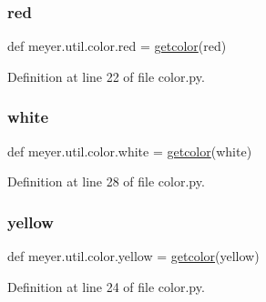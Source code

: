 \mbox{\label{namespacemeyer_1_1util_1_1color_a73b6737d01fe2c13bcb4b9ce85929329}} 
\subsubsection{\texorpdfstring{red}{red}}
{\footnotesize\ttfamily def meyer.\+util.\+color.\+red = \hyperlink{namespacemeyer_1_1util_1_1color_a777b068ba3d7bb397cb83871d691ecf5}{getcolor}(\textquotesingle{}red\textquotesingle{})}



Definition at line 22 of file color.\+py.

\mbox{\label{namespacemeyer_1_1util_1_1color_a54c3aa0aab3ccea89e2b6928b4e23d6d}} 
\subsubsection{\texorpdfstring{white}{white}}
{\footnotesize\ttfamily def meyer.\+util.\+color.\+white = \hyperlink{namespacemeyer_1_1util_1_1color_a777b068ba3d7bb397cb83871d691ecf5}{getcolor}(\textquotesingle{}white\textquotesingle{})}



Definition at line 28 of file color.\+py.

\mbox{\label{namespacemeyer_1_1util_1_1color_ac0f324d815814186c496b02c58e20a61}} 
\subsubsection{\texorpdfstring{yellow}{yellow}}
{\footnotesize\ttfamily def meyer.\+util.\+color.\+yellow = \hyperlink{namespacemeyer_1_1util_1_1color_a777b068ba3d7bb397cb83871d691ecf5}{getcolor}(\textquotesingle{}yellow\textquotesingle{})}



Definition at line 24 of file color.\+py.

